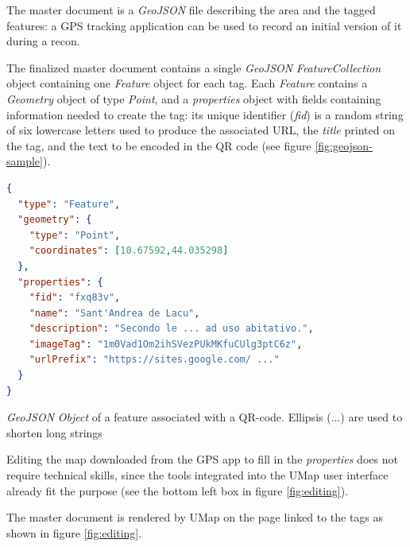 \documentclass[sustainability,article,submit,pdftex,moreauthors]{Definitions/mdpi}
\begin{document}
The master document is a \emph{GeoJSON} file describing the area and the tagged features: a GPS tracking application can be used to record an initial version of it during a recon.

The finalized master document contains a single \emph{GeoJSON} \emph{FeatureCollection} object containing one \emph{Feature} object for each tag. Each \emph{Feature} contains a \emph{Geometry} object of type \emph{Point}, and a \emph{properties} object with fields containing information needed to create the tag: its unique identifier (\emph{fid}) is a random string of six lowercase letters used to produce the associated URL, the \emph{title} printed on the tag, and the text to be encoded in the QR code (see figure \ref{fig:geojson-sample}).

\begin{table}
\begin{lstlisting}[language=json]
{
  "type": "Feature",
  "geometry": { 
    "type": "Point", 
    "coordinates": [10.67592,44.035298]
  },
  "properties": {
    "fid": "fxq83v",
    "name": "Sant'Andrea de Lacu",
    "description": "Secondo le ... ad uso abitativo.",
    "imageTag": "1m0Vad1Om2ihSVezPUkMKfuCUlg3ptC6z",
    "urlPrefix": "https://sites.google.com/ ..."
  }
}
\end{lstlisting}
\caption{\emph{GeoJSON} \emph{Object} of a feature associated with a QR-code. Ellipsis (...) are used to shorten long strings  \label{fig:geojson-sample}}
\end{table}


Editing the map downloaded from the GPS app to fill in the {\em properties} does not require technical skills, since the tools integrated into the UMap user interface already fit the purpose (see the bottom left box in figure \ref{fig:editing}).


The master document is rendered by UMap on the page linked to the tags as shown in figure \ref{fig:editing}.

\end{document}
